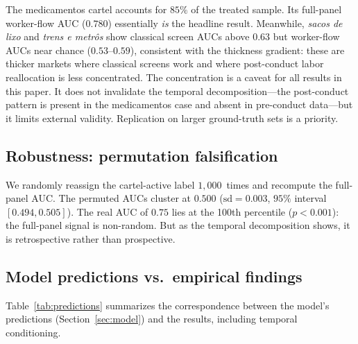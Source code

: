 The medicamentos cartel accounts for $85\%$ of the treated sample. Its full-panel worker-flow AUC ($0.780$) essentially \emph{is} the headline result. Meanwhile, \emph{sacos de lixo} and \emph{trens e metr\^{o}s} show classical screen AUCs above $0.63$ but worker-flow AUCs near chance ($0.53$--$0.59$), consistent with the thickness gradient: these are thicker markets where classical screens work and where post-conduct labor reallocation is less concentrated. The concentration is a caveat for all results in this paper. It does not invalidate the temporal decomposition---the post-conduct pattern is present in the medicamentos case and absent in pre-conduct data---but it limits external validity. Replication on larger ground-truth sets is a priority.

\subsection{Robustness: permutation falsification}\label{sec:robustness}

We randomly reassign the cartel-active label $1{,}000$~times and recompute the full-panel AUC. The permuted AUCs cluster at $0.500$ ($\text{sd} = 0.003$, $95\%$ interval $[0.494, 0.505]$). The real AUC of $0.75$ lies at the 100th percentile ($p < 0.001$): the full-panel signal is non-random. But as the temporal decomposition shows, it is retrospective rather than prospective.

\subsection{Model predictions vs.\ empirical findings}\label{sec:model_test}

Table~\ref{tab:predictions} summarizes the correspondence between the model's predictions (Section~\ref{sec:model}) and the results, including temporal conditioning.

